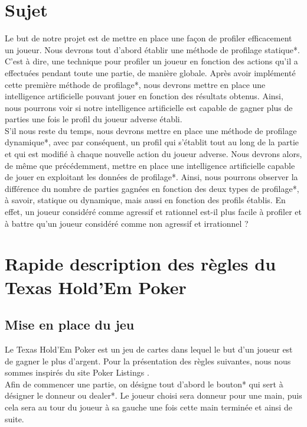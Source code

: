 \documentclass{report}
\begin{document}
\section{Sujet}
\hspace{0.5cm}Le but de notre projet est de mettre en place une façon de profiler efficacement un joueur. Nous devrons tout d'abord établir une méthode de profilage statique*. C'est à dire, une technique pour profiler un joueur en fonction des actions qu'il a effectuées pendant toute une partie, de manière globale. Après avoir implémenté cette première méthode de profilage*, nous devrons mettre en place une intelligence artificielle pouvant jouer en fonction des résultats obtenus. Ainsi, nous pourrons voir si notre intelligence artificielle est capable de gagner plus de parties une fois le profil du joueur adverse établi. \\

S'il nous reste du temps, nous devrons mettre en place une méthode de profilage dynamique*, avec par conséquent, un profil qui s’établit tout au long de la partie et qui est modifié à chaque nouvelle action du joueur adverse. Nous devrons alors, de même que précédemment, mettre en place une intelligence artificielle capable de jouer en exploitant les données de profilage*. Ainsi, nous pourrons observer la différence du nombre de parties gagnées en fonction des deux types de profilage*, à savoir, statique ou dynamique, mais aussi en fonction des profils établis. En effet, un joueur considéré comme agressif et rationnel est-il plus facile à profiler et à battre qu'un joueur considéré comme non agressif et irrationnel ?\par

\section{Rapide description des règles du Texas Hold'Em Poker}
\subsection{Mise en place du jeu}
\hspace{0.5cm}Le Texas Hold'Em Poker est un jeu de cartes dans lequel le but d'un joueur est de gagner le plus d'argent. Pour la présentation des règles suivantes, nous nous sommes inspirés du site Poker Listings \cite{pokerListings}. \\

Afin de commencer une partie, on désigne tout d'abord le bouton* qui sert à désigner le donneur ou dealer*. Le joueur choisi sera donneur pour une main, puis cela sera au tour du joueur à sa gauche une fois cette main terminée et ainsi de suite.  \\
\end{document}
